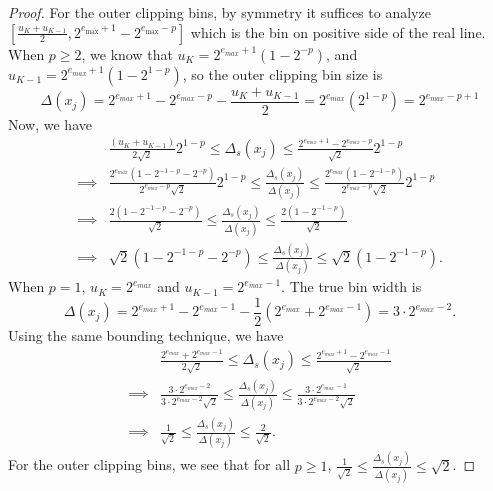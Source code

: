 \documentclass[12pt,onecolumn, margin=1in]{IEEEtran}
\newcommand{\paren}[1]{\left( #1 \right)}
\begin{document}
\begin{proof}
For the outer clipping bins, by symmetry it suffices to analyze $[\frac{u_K + u_{K-1}}{2}, 2^{e_{\max}+1}-2^{e_{\max}-p}]$ which is the bin on positive side of the real line. When $p \geq 2$, we know that $u_K = 2^{e_{max}+1}(1 - 2^{-p})$, and $u_{K-1} = 2^{e_{max}+1}(1 - 2^{1-p})$, so the outer clipping bin size is \begin{equation}
\Delta(x_j) = 2^{e_{max} + 1} - 2^{e_{max} - p}- \frac{u_K + u_{K-1}}{2} = 2^{e_{max}}\paren{2^{1-p}} = 2^{e_{max}-p + 1}
\end{equation}
Now, we have
\begin{equation}
\begin{aligned}
  &\frac{(u_K + u_{K-1})}{2\sqrt{2}}2^{1-p} \leq \Delta_s(x_j) \leq \frac{2^{e_{max} + 1} - 2^{e_{max} - p}}{\sqrt{2}}2^{1-p}\\
  \implies &\frac{ 2^{e_{max}}(1 - 2^{-1-p} - 2^{-p})}{2^{e_{max} - p}\sqrt{2}}2^{1-p} \leq \frac{\Delta_s(x_j)}{\Delta(x_j)} \leq \frac{2^{e_{max}}(1 - 2^{-1 - p})}{2^{e_{max} - p}\sqrt{2}}2^{1-p}\\
  \implies &\frac{ 2(1 - 2^{-1-p} - 2^{-p})}{\sqrt{2}} \leq \frac{\Delta_s(x_j)}{\Delta(x_j)} \leq \frac{2(1- 2^{-1-p})}{\sqrt{2}}\\
  \implies &\sqrt{2}(1 - 2^{-1-p} - 2^{-p}) \leq \frac{\Delta_s(x_j)}{\Delta(x_j)} \leq \sqrt{2}(1- 2^{-1-p}).
\end{aligned}
\end{equation}
When $p = 1$, $u_K = 2^{e_{max}}$ and $u_{K-1} = 2^{e_{max}-1}$. The true bin width is 
\begin{equation}
\Delta(x_j) = 2^{e_{max}+1} - 2^{e_{max}-1} - \frac{1}{2}(2^{e_{max}} + 2^{e_{max}-1}) = 3\cdot2^{e_{max}-2}.
\end{equation}
Using the same bounding technique, we have
\begin{equation}
\begin{aligned}
  &\frac{2^{e_{max}} + 2^{e_{max}-1}}{2\sqrt{2}} \leq \Delta_s(x_j) \leq \frac{2^{e_{max}+1} - 2^{e_{max}-1}}{\sqrt{2}}\\
  \implies &\frac{3\cdot 2^{e_{max}-2}}{3\cdot2^{e_{max}-2}\sqrt{2}} \leq \frac{\Delta_s(x_j)}{\Delta(x_j)} \leq \frac{3\cdot 2^{e_{max}-1}}{3\cdot2^{e_{max}-2}\sqrt{2}}\\
  \implies &\frac{ 1}{\sqrt{2}} \leq \frac{\Delta_s(x_j)}{\Delta(x_j)} \leq \frac{2}{\sqrt{2}}.
\end{aligned}
\end{equation}
For the outer clipping bins, we see that for all $p\geq 1$, $\frac{1}{\sqrt{2}} \leq \frac{\Delta_s(x_j)}{\Delta(x_j)} \leq \sqrt{2}$.


\end{proof}
\end{document}
